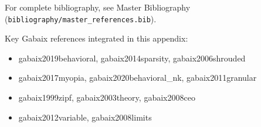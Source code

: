 \nocite{bcm_master}

For complete bibliography, see Master Bibliography (\texttt{bibliography/master\_references.bib}).

Key Gabaix references integrated in this appendix:
\begin{itemize}[nosep]
    \item gabaix2019behavioral, gabaix2014sparsity, gabaix2006shrouded
    \item gabaix2017myopia, gabaix2020behavioral\_nk, gabaix2011granular
    \item gabaix1999zipf, gabaix2003theory, gabaix2008ceo
    \item gabaix2012variable, gabaix2008limits
\end{itemize}


